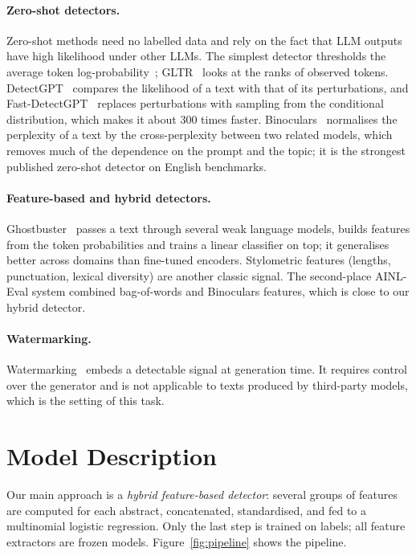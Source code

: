 \documentclass{article}
\begin{document}
\paragraph{Zero-shot detectors.}
Zero-shot methods need no labelled data and rely on the fact that LLM outputs have high likelihood under other LLMs. The simplest detector thresholds the average token log-probability~\cite{ainleval2025}; GLTR~\cite{gltr} looks at the ranks of observed tokens. DetectGPT~\cite{detectgpt} compares the likelihood of a text with that of its perturbations, and Fast-DetectGPT~\cite{fastdetectgpt} replaces perturbations with sampling from the conditional distribution, which makes it about 300 times faster. Binoculars~\cite{binoculars} normalises the perplexity of a text by the cross-perplexity between two related models, which removes much of the dependence on the prompt and the topic; it is the strongest published zero-shot detector on English benchmarks.

\paragraph{Feature-based and hybrid detectors.}
Ghostbuster~\cite{ghostbuster} passes a text through several weak language models, builds features from the token probabilities and trains a linear classifier on top; it generalises better across domains than fine-tuned encoders. Stylometric features (lengths, punctuation, lexical diversity) are another classic signal. The second-place AINL-Eval system combined bag-of-words and Binoculars features, which is close to our hybrid detector.

\paragraph{Watermarking.}
Watermarking~\cite{watermark} embeds a detectable signal at generation time. It requires control over the generator and is not applicable to texts produced by third-party models, which is the setting of this task.



\section{Model Description}
\label{sec:model}
Our main approach is a \emph{hybrid feature-based detector}: several groups of features are computed for each abstract, concatenated, standardised, and fed to a multinomial logistic regression. Only the last step is trained on labels; all feature extractors are frozen models. Figure~\ref{fig:pipeline} shows the pipeline.
\end{document}
